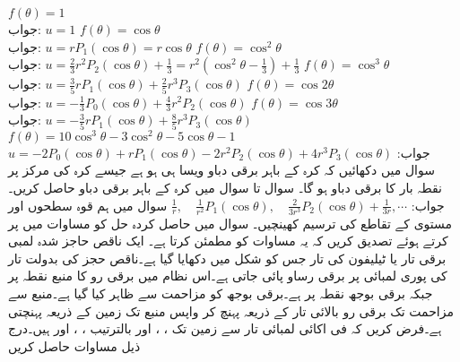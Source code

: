 \quad
$f(\theta)=1$\\
جواب:\quad
$u=1$
\quad
$f(\theta)=\cos \theta$\\
جواب:\quad
$u=rP_1(\cos\theta)=r\cos\theta$
\quad
$f(\theta)=\cos^2 \theta$\\
جواب:\quad
$u=\tfrac{2}{3}r^2P_2(\cos\theta)+\tfrac{1}{3}=r^2(\cos^2\theta-\tfrac{1}{3})+\tfrac{1}{3}$
\quad
$f(\theta)=\cos^3 \theta$\\
جواب:\quad
$u=\tfrac{3}{5}rP_1(\cos\theta)+\tfrac{2}{5}r^3P_3(\cos\theta)$
\quad
$f(\theta)=\cos 2\theta$\\
جواب:\quad
$u=-\tfrac{1}{3}P_0(\cos\theta)+\tfrac{4}{3}r^2P_2(\cos\theta)$
\quad
$f(\theta)=\cos 3\theta$\\
جواب:\quad
$u=-\tfrac{3}{5}rP_1(\cos\theta)+\tfrac{8}{5}r^3P_3(\cos\theta)$
\quad
$f(\theta)=10\cos^3\theta-3\cos^2\theta-5\cos\theta-1$\\
جواب:\quad
$u=-2P_0(\cos\theta)+rP_1(\cos\theta)-2r^2P_2(\cos\theta)+4r^3P_3(\cos\theta)$
\quad
سوال  میں دکھائیں کہ کرہ کے باہر برقی دباو ویسا ہی ہو ہے جیسے کرہ کی مرکز پر نقطہ بار کا برقی دباو ہو گا۔
\quad
سوال  تا سوال  میں کرہ کے باہر برقی دباو حاصل کریں۔\\
جواب:\quad
$\tfrac{1}{r},\quad \tfrac{1}{r^2}P_1(\cos\theta),\quad \tfrac{2}{3r^3}P_2(\cos\theta)+\tfrac{1}{3r},\cdots$
\quad
سوال  میں ہم قوہ سطحوں  اور  مستوی کے تقاطع کی ترسیم کھینچیں۔ 
\quad
سوال  میں حاصل کردہ حل کو مساوات  میں پر کرتے ہوئے تصدیق کریں کہ یہ مساوات   کو مطمئن کرتا ہے۔
\quad {}
ایک ناقص حاجز شدہ لمبی برقی تار یا ٹیلیفون کی تار  جس کو شکل  میں دکھایا گیا ہے۔ناقص حجز  کی بدولت تار کی پوری لمبائی پر برقی رساو پائی جاتی ہے۔اس نظام میں برقی رو  کا منبع نقطہ  پر جبکہ برقی بوجھ نقطہ  پر ہے۔برقی بوجھ کو مزاحمت سے ظاہر کیا گیا ہے۔منبع سے مزاحمت تک برقی رو  بالائی تار کے ذریعہ پہنچ کر واپس منبع تک زمین کے ذریعہ پہنچتی ہے۔فرض کریں کہ فی اکائی لمبائی تار سے زمین تک ، ،  اور  بالترتیب ، ،  اور  ہیں۔درج ذیل مساوات حاصل کریں
